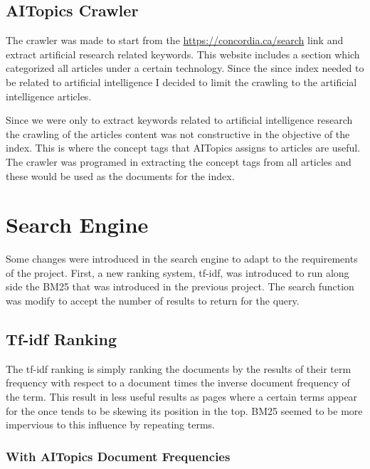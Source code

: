 \subsection{AITopics Crawler}

\par The crawler was made to start from the \url{https://concordia.ca/search} link and extract artificial research related keywords. This website includes a section which categorized all articles under a certain technology. Since the since index needed to be related to artificial intelligence I decided to limit the crawling to the artificial intelligence articles.
\par Since we were only to extract keywords related to artificial intelligence research the crawling of the articles content was not constructive in the objective of the index. This is where the concept tags that AITopics assigns to articles are useful. The crawler was programed in extracting the concept tags from all articles and these would be used as the documents for the index.


\section{Search Engine}

\par Some changes were introduced in the search engine to adapt to the requirements of the project. First, a new ranking system, tf-idf, was introduced to run along side the BM25 that was introduced in the previous project. The search function was modify to accept the number of results to return for the query.

\subsection{Tf-idf Ranking} \label{tf-idf}

The tf-idf ranking is simply ranking the documents by the results of their term frequency with respect to a document times the inverse document frequency of the term. This result in less useful results as pages where a certain terms appear for the once tends to be skewing its position in the top. BM25 seemed to be more impervious to this influence by repeating terms.

\subsubsection{With AITopics Document Frequencies}

